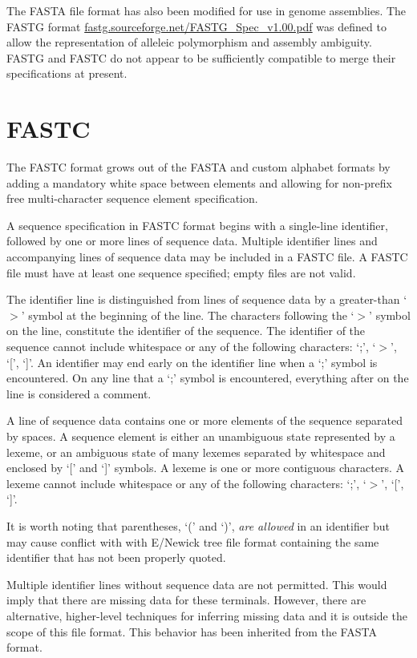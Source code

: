 \documentclass[12pt]{article}
\begin{document}
The FASTA file format has also been modified for use in genome assemblies. The FASTG format \url{fastg.sourceforge.net/FASTG_Spec_v1.00.pdf} was defined to allow the
representation of alleleic polymorphism and assembly ambiguity.  FASTG and FASTC do not appear to be sufficiently compatible to merge their specifications at present.

\section{FASTC}
The FASTC format grows out of the FASTA and custom alphabet formats by adding a mandatory white space between elements and allowing for non-prefix free multi-character sequence element specification. 

A sequence specification in FASTC format begins with a single-line identifier, followed by one or more lines of sequence data. Multiple identifier lines and accompanying lines of sequence data may be included in a FASTC file. A FASTC file must have at least one sequence specified; empty files are not valid.

The identifier line is distinguished from lines of sequence data by a greater-than `$>$' symbol at the beginning of the line.
The characters following the `$>$' symbol on the line, constitute the identifier of the sequence.
The identifier of the sequence cannot include whitespace or any of the following characters: `;', `$>$', `[', `]'.
An identifier may end early on the identifier line when a `;' symbol is encountered. On any line that a `;' symbol is encountered, everything after on the line is considered a comment.

A line of sequence data contains one or more elements of the sequence separated by spaces.
A sequence element is either an unambiguous state represented by a lexeme, or an ambiguous state of many lexemes separated by whitespace and enclosed by `[' and `]' symbols. A lexeme is one or more contiguous characters. A lexeme cannot include whitespace or any of the following characters: `;', `$>$', `[', `]'.

It is worth noting that parentheses, `(' and `)', \textit{are allowed} in an identifier but may cause conflict with with E/Newick tree file format \citep{Cardonaetal2008} containing the same identifier that has not been properly quoted.

Multiple identifier lines without sequence data are not permitted. This would imply that there are missing data for these terminals. However, there are alternative, higher-level techniques for inferring missing data and it is outside the scope of this file format. This behavior has been inherited from the FASTA format.
\end{document}

